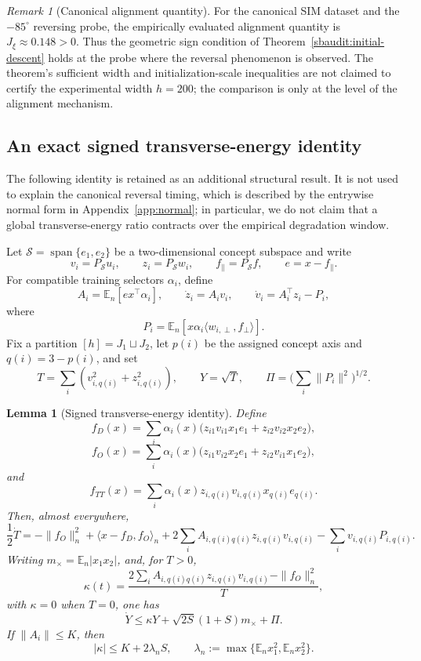\documentclass[10pt]{article}
\newtheorem{lemma}[theorem]{Lemma}
\theoremstyle{remark}\newtheorem{remark}[theorem]{Remark}
\begin{document}
\begin{remark}[Canonical alignment quantity]
For the canonical SIM dataset and the \(-85^\circ\) reversing probe, the
empirically evaluated alignment quantity is \(J_\xi\approx0.148>0\).
Thus the geometric sign condition of Theorem~\ref{sbaudit:initial-descent}
holds at the probe where the reversal phenomenon is observed. The theorem's
sufficient width and initialization-scale inequalities are not claimed to
certify the experimental width \(h=200\); the comparison is only at the level
of the alignment mechanism.
\end{remark}



\subsection{An exact signed transverse-energy identity}

The following identity is retained as an additional structural result.  It is
not used to explain the canonical reversal timing, which is described by the
entrywise normal form in Appendix~\ref{app:normal}; in particular, we do not
claim that a global transverse-energy ratio contracts over the empirical
degradation window.

Let \(\mathcal S=\operatorname{span}\{e_1,e_2\}\) be a two-dimensional
concept subspace and write
\[
 v_i=P_{\mathcal S}u_i,\qquad z_i=P_{\mathcal S}w_i,\qquad
 f_\parallel=P_{\mathcal S}f,\qquad e=x-f_\parallel.
\]
For compatible training selectors \(\alpha_i\), define
\[
 A_i=\mathbb E_n[e x^\top\alpha_i],\qquad
 \dot z_i=A_iv_i,\qquad
 \dot v_i=A_i^\top z_i-P_i,
\]
where
\[
 P_i=\mathbb E_n[x\alpha_i\langle w_{i,\perp},f_\perp\rangle].
\]
Fix a partition \([h]=J_1\sqcup J_2\), let \(p(i)\) be the assigned concept
axis and \(q(i)=3-p(i)\), and set
\[
 T=\sum_i(v_{i,q(i)}^2+z_{i,q(i)}^2),\qquad
 Y=\sqrt T,\qquad
 \Pi=\Big(\sum_i\|P_i\|^2\Big)^{1/2}.
\]

\begin{lemma}[Signed transverse-energy identity]
\label{sbsign:energy}
Define
\[
 f_D(x)=\sum_i\alpha_i(x)
   \bigl(z_{i1}v_{i1}x_1e_1+z_{i2}v_{i2}x_2e_2\bigr),
\]
\[
 f_O(x)=\sum_i\alpha_i(x)
   \bigl(z_{i1}v_{i2}x_2e_1+z_{i2}v_{i1}x_1e_2\bigr),
\]
and
\[
 f_{TT}(x)=\sum_i\alpha_i(x)
 z_{i,q(i)}v_{i,q(i)}x_{q(i)}e_{q(i)}.
\]
Then, almost everywhere,
\begin{equation}\label{sbsign:identity}
 \frac12\dot T
 =-\|f_O\|_n^2+\langle x-f_D,f_O\rangle_n
 +2\sum_i A_{i,q(i)q(i)}z_{i,q(i)}v_{i,q(i)}
 -\sum_i v_{i,q(i)}P_{i,q(i)}.
\end{equation}
Writing \(m_\times=\mathbb E_n|x_1x_2|\), and, for \(T>0\),
\[
 \kappa(t)=
 \frac{2\sum_i A_{i,q(i)q(i)}z_{i,q(i)}v_{i,q(i)}
       -\|f_O\|_n^2}{T},
\]
with \(\kappa=0\) when \(T=0\), one has
\begin{equation}\label{sbsign:Y}
 \dot Y\le
 \kappa Y+\sqrt{2S}(1+S)m_\times+\Pi.
\end{equation}
If \(\|A_i\|\le K\), then
\[
 |\kappa|\le K+2\lambda_nS,
 \qquad
 \lambda_n:=\max\{\mathbb E_nx_1^2,\mathbb E_nx_2^2\}.
\]
\end{lemma}
\end{document}
